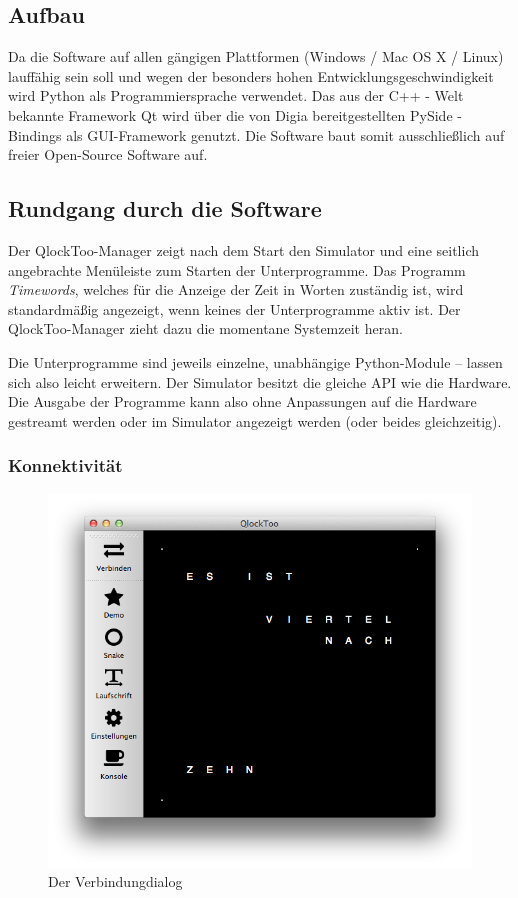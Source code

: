 \subsection{Aufbau}
Da die Software auf allen gängigen Plattformen (Windows / Mac OS X / Linux) lauffähig sein soll und wegen der besonders hohen Entwicklungsgeschwindigkeit wird Python als Programmiersprache verwendet.
Das aus der C++ - Welt bekannte Framework Qt wird über die von Digia bereitgestellten PySide -Bindings als GUI-Framework genutzt. Die Software baut somit ausschließlich auf freier Open-Source Software auf.

\subsection{Rundgang durch die Software}
Der QlockToo-Manager zeigt nach dem Start den Simulator und eine seitlich angebrachte Menüleiste zum Starten der Unterprogramme.
Das Programm \emph{Timewords}, welches für die Anzeige der Zeit in Worten zuständig ist, wird standardmäßig angezeigt, wenn keines der Unterprogramme aktiv ist. Der QlockToo-Manager zieht dazu die momentane Systemzeit heran.

Die Unterprogramme sind jeweils einzelne, unabhängige Python-Module -- lassen sich also leicht erweitern.
Der Simulator besitzt die gleiche API wie die Hardware. Die Ausgabe der Programme kann also ohne Anpassungen auf die Hardware gestreamt werden oder im Simulator angezeigt werden (oder beides gleichzeitig).

\subsubsection{Konnektivität}
\begin{figure}[h]
    \centering
    \includegraphics[width=\columnwidth,draft]{Abbildungen/Manager}
    \caption[Verbindungsdialog]{Der Verbindungdialog}
    \label{fig:Verbindungsdialog}
\end{figure}


